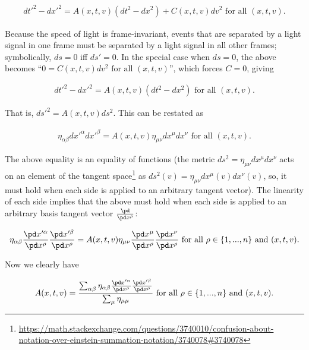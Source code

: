 \begin{align*}
	dt'^2 - dx'^2 = A(x, t, v) (dt^2 - dx^2) + C(x, t, v) dv^2 \text{ for all $(x, t, v)$}.
\end{align*}

Because the speed of light is frame-invariant, events that are separated by a light signal in one frame must be separated by a light signal in all other frames; symbolically, $ds = 0$ iff $ds' = 0$. In the special case when $ds = 0$, the above becomes ``$0 = C(x, t, v) dv^2 \text{ for all $(x, t, v)$}$'', which forces $C = 0$, giving

\begin{align*}
	dt'^2 - dx'^2 = A(x, t, v)(dt^2 - dx^2) \text{ for all $(x, t, v)$}.
\end{align*}

That is, $ds'^2 = A(x, t, v) ds^2$. This can be restated as

\begin{align*}
	\eta_{\alpha \beta} dx'^\alpha dx'^\beta = A(x, t, v) \eta_{\mu \nu} dx^\mu dx^\nu \text{ for all $(x, t, v)$}.
\end{align*}

The above equality is an equality of functions (the metric $ds^2 = \eta_{\mu \nu} dx^\mu dx^\nu$ acts on an element of the tangent space\footnote{\url{https://math.stackexchange.com/questions/3740010/confusion-about-notation-over-einstein-summation-notation/3740078#3740078}} as $ds^2(v) = \eta_{\mu \nu} dx^\mu(v) dx^\nu(v)$, so, it must hold when each side is applied to an arbitrary tangent vector). The linearity of each side implies that the above must hold when each side is applied to an arbitrary basis tangent vector $\frac{\pd}{\pd x^\rho}$:

\begin{align*}
	\eta_{\alpha \beta} \frac{\pd x'^\alpha}{\pd x^\rho} \frac{\pd x'^\beta}{\pd x^\rho} = A(x, t, v) \eta_{\mu \nu} \frac{\pd x^\mu}{\pd x^\rho} \frac{\pd x^\nu}{\pd x^\rho} \text{ for all $\rho \in \{1, ..., n\}$} \text{ and $(x, t, v)$}.
\end{align*}

Now we clearly have

\begin{align*}
	A(x, t, v) = \frac{\sum_{\alpha \beta} \eta_{\alpha \beta} \frac{\pd x'^\alpha}{\pd x^\rho} \frac{\pd x'^\beta}{\pd x^\rho}}{\sum_\mu \eta_{\mu \mu} } \text{ for all $\rho \in \{1, ..., n\}$} \text{ and $(x, t, v)$}.
\end{align*}

